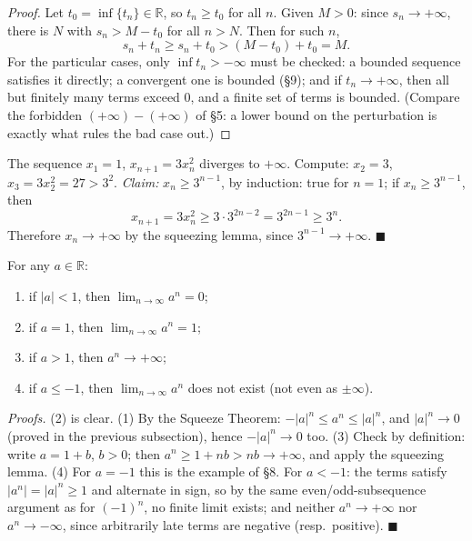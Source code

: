 \documentclass[11pt]{report}
\begin{document}
\begin{proof}
Let $t_0 = \inf\{t_n\} \in \mathbb{R}$, so $t_n \geq t_0$ for all $n$. Given $M > 0$: since $s_n \to +\infty$, there is $N$ with $s_n > M - t_0$ for all $n > N$. Then for such $n$,
\[
s_n + t_n \geq s_n + t_0 > (M - t_0) + t_0 = M.
\]
For the particular cases, only $\inf t_n > -\infty$ must be checked: a bounded sequence satisfies it directly; a convergent one is bounded (\S 9); and if $t_n \to +\infty$, then all but finitely many terms exceed $0$, and a finite set of terms is bounded. (Compare the forbidden $(+\infty) - (+\infty)$ of \S 5: a lower bound on the perturbation is exactly what rules the bad case out.)
\end{proof}

\begin{exbox}
The sequence $x_1 = 1$, $x_{n+1} = 3 x_n^2$ diverges to $+\infty$. Compute: $x_2 = 3$, $x_3 = 3 x_2^2 = 27 > 3^2$. \emph{Claim:} $x_n \geq 3^{n-1}$, by induction: true for $n = 1$; if $x_n \geq 3^{n-1}$, then
\[
x_{n+1} = 3 x_n^2 \geq 3 \cdot 3^{2n-2} = 3^{2n-1} \geq 3^n.
\]
Therefore $x_n \to +\infty$ by the squeezing lemma, since $3^{n-1} \to +\infty$. \hfill $\blacksquare$
\end{exbox}

\begin{exbox}
For any $a \in \mathbb{R}$:
\begin{enumerate}[label=(\arabic*)]
    \item if $|a| < 1$, then $\lim_{n\to\infty} a^n = 0$;
    \item if $a = 1$, then $\lim_{n\to\infty} a^n = 1$;
    \item if $a > 1$, then $a^n \to +\infty$;
    \item if $a \leq -1$, then $\lim_{n\to\infty} a^n$ does not exist (not even as $\pm\infty$).
\end{enumerate}
\emph{Proofs.} (2) is clear. (1) By the Squeeze Theorem: $-|a|^n \leq a^n \leq |a|^n$, and $|a|^n \to 0$ (proved in the previous subsection), hence $-|a|^n \to 0$ too. (3) Check by definition: write $a = 1 + b$, $b > 0$; then $a^n \geq 1 + nb > nb \to +\infty$, and apply the squeezing lemma. (4) For $a = -1$ this is the example of \S 8. For $a < -1$: the terms satisfy $|a^n| = |a|^n \geq 1$ and alternate in sign, so by the same even/odd-subsequence argument as for $(-1)^n$, no finite limit exists; and neither $a^n \to +\infty$ nor $a^n \to -\infty$, since arbitrarily late terms are negative (resp.\ positive). \hfill $\blacksquare$
\end{exbox}
\end{document}
